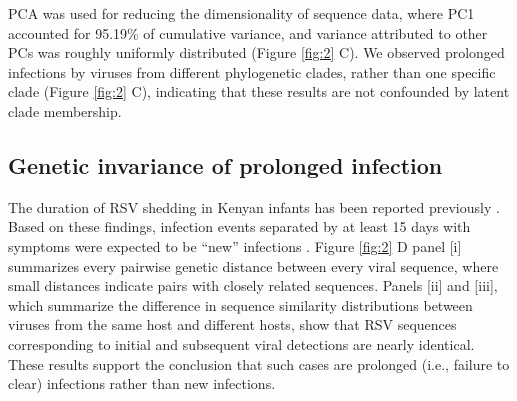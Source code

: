\documentclass{article} %
\begin{document}
PCA was used for reducing the dimensionality of sequence data, where PC1 accounted for 95.19\% of cumulative variance, and variance attributed to other PCs was roughly uniformly distributed (Figure \ref{fig:2} C). 
We observed prolonged infections by viruses from different phylogenetic clades, rather than one specific clade (Figure \ref{fig:2} C), indicating that these results are not confounded by latent clade membership. 

\subsection{Genetic invariance of prolonged infection}
The duration of RSV shedding in Kenyan infants has been reported previously 
\citep{okiro2010duration}.
Based on these findings, infection events separated by at least 15 days with symptoms were expected to be ``new'' infections \citep{okiro2010duration}. 
Figure \ref{fig:2} D panel [i] summarizes every pairwise genetic distance between every viral sequence, where small distances indicate pairs with closely related sequences. 
Panels [ii] and [iii], which summarize the difference in sequence similarity distributions between viruses from the same host and different hosts, show that RSV sequences corresponding to initial and subsequent viral detections are nearly identical. 
These results support the conclusion that such cases are prolonged (i.e., failure to clear) infections rather than new infections. 
\end{document}
